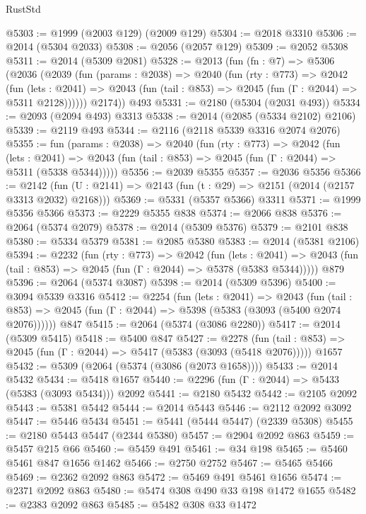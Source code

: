 \begin{lexlean}{RustStd}
\begin{coremodule}
@5303 := @1999 (@2003 @129) (@2009 @129)
@5304 := @2018 @3310
@5306 := @2014 (@5304 @2033)
@5308 := @2056 (@2057 @129)
@5309 := @2052 @5308
@5311 := @2014 (@5309 @2081)
@5328 := @2013
    (fun (fn : @7) =>
    @5306
      (@2036
        (@2039
          (fun (params : @2038) =>
          @2040
            (fun (rty : @773) =>
            @2042
              (fun (lets : @2041) =>
              @2043 (fun (tail : @853) => @2045 (fun (Γ : @2044) => @5311 @2128))))))
        @2174))
    @493
@5331 := @2180 (@5304 (@2031 @493))
@5334 := @2093 (@2094 @493) @3313
@5338 := @2014 (@2085 (@5334 @2102) @2106)
@5339 := @2119 @493
@5344 := @2116 (@2118 @5339 @3316 @2074 @2076)
@5355 := fun (params : @2038) =>
  @2040
    (fun (rty : @773) =>
    @2042
      (fun (lets : @2041) =>
      @2043 (fun (tail : @853) => @2045 (fun (Γ : @2044) => @5311 (@5338 @5344)))))
@5356 := @2039 @5355
@5357 := @2036 @5356
@5366 := @2142 (fun (U : @2141) => @2143 (fun (t : @29) => @2151 (@2014 (@2157 @3313 @2032) @2168)))
@5369 := @5331 (@5357 @5366) @3311
@5371 := @1999 @5356 @5366
@5373 := @2229 @5355 @838
@5374 := @2066 @838
@5376 := @2064 (@5374 @2079)
@5378 := @2014 (@5309 @5376)
@5379 := @2101 @838
@5380 := @5334 @5379
@5381 := @2085 @5380
@5383 := @2014 (@5381 @2106)
@5394 := @2232
    (fun (rty : @773) =>
    @2042
      (fun (lets : @2041) =>
      @2043 (fun (tail : @853) => @2045 (fun (Γ : @2044) => @5378 (@5383 @5344)))))
    @879
@5396 := @2064 (@5374 @3087)
@5398 := @2014 (@5309 @5396)
@5400 := @3094 @5339 @3316
@5412 := @2254
    (fun (lets : @2041) =>
    @2043
      (fun (tail : @853) => @2045 (fun (Γ : @2044) => @5398 (@5383 (@3093 (@5400 @2074 @2076))))))
    @847
@5415 := @2064 (@5374 (@3086 @2280))
@5417 := @2014 (@5309 @5415)
@5418 := @5400 @847
@5427 := @2278
    (fun (tail : @853) => @2045 (fun (Γ : @2044) => @5417 (@5383 (@3093 (@5418 @2076)))))
    @1657
@5432 := @5309 (@2064 (@5374 (@3086 (@2073 @1658))))
@5433 := @2014 @5432
@5434 := @5418 @1657
@5440 := @2296 (fun (Γ : @2044) => @5433 (@5383 (@3093 @5434))) @2092
@5441 := @2180 @5432
@5442 := @2105 @2092
@5443 := @5381 @5442
@5444 := @2014 @5443
@5446 := @2112 @2092 @3092
@5447 := @5446 @5434
@5451 := @5441 (@5444 @5447) (@2339 @5308)
@5455 := @2180 @5443 @5447 (@2344 @5380)
@5457 := @2904 @2092 @863
@5459 := @5457 @215 @66
@5460 := @5459 @491
@5461 := @34 @198
@5465 := @5460 @5461 @847 @1656 @1462
@5466 := @2750 @2752
@5467 := @5465 @5466
@5469 := @2362 @2092 @863
@5472 := @5469 @491 @5461 @1656
@5474 := @2371 @2092 @863
@5480 := @5474 @308 @490 @33 @198 @1472 @1655
@5482 := @2383 @2092 @863
@5485 := @5482 @308 @33 @1472

\end{coremodule}
\end{lexlean}
